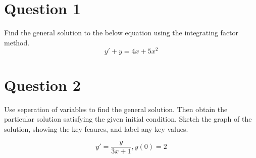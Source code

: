 \documentclass{article}
\begin{document}
\section*{Question 1}

Find the general solution to the below equation using the integrating factor
method.
$$y' + y = 4x + 5x^2$$

\section*{Question 2}

Use seperation of variables to find the general solution. Then
obtain the particular solution satisfying the given initial condition.
Sketch the graph of the solution, showing the key feaures, and label any
key values.

$$y' = \frac{y}{3x+1}, y(0) = 2$$
\end{document}

